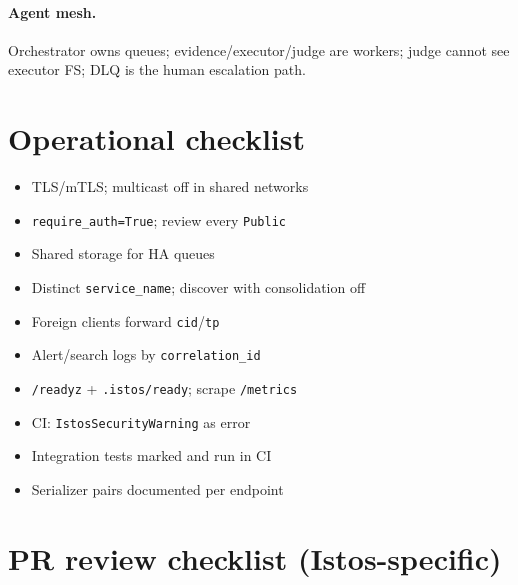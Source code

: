 \documentclass[11pt,a4paper]{article}
\begin{document}
\paragraph{Agent mesh.} Orchestrator owns queues; evidence/executor/judge are
workers; judge cannot see executor FS; DLQ is the human escalation path.

\section{Operational checklist}

\begin{itemize}[leftmargin=*]
  \item[$\square$] TLS/mTLS; multicast off in shared networks
  \item[$\square$] \texttt{require\_auth=True}; review every \texttt{Public}
  \item[$\square$] Shared storage for HA queues
  \item[$\square$] Distinct \texttt{service\_name}; discover with consolidation off
  \item[$\square$] Foreign clients forward \texttt{cid}/\texttt{tp}
  \item[$\square$] Alert/search logs by \texttt{correlation\_id}
  \item[$\square$] \texttt{/readyz} + \texttt{.istos/ready}; scrape \texttt{/metrics}
  \item[$\square$] CI: \texttt{IstosSecurityWarning} as error
  \item[$\square$] Integration tests marked and run in CI
  \item[$\square$] Serializer pairs documented per endpoint
\end{itemize}

\section{PR review checklist (Istos-specific)}
\end{document}
